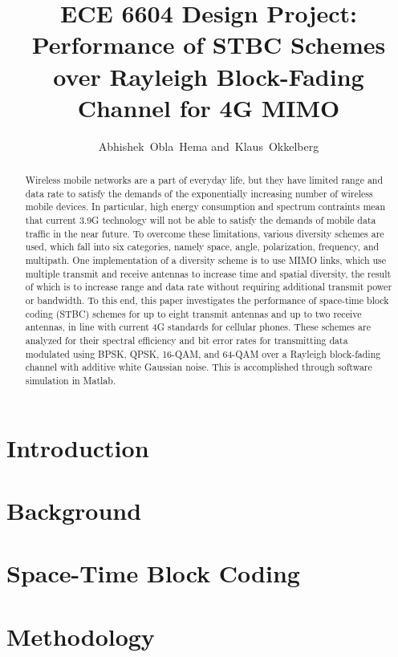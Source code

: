 \documentclass[12pt,onecolumn]{IEEEtran}
\title{ECE 6604 Design Project:\\ Performance of STBC Schemes over Rayleigh Block-Fading Channel for 4G MIMO}
\author{Abhishek~Obla~Hema and~Klaus~Okkelberg}
\begin{document}
\maketitle

\begin{abstract}
  Wireless mobile networks are a part of everyday life, but they have limited range and data rate to satisfy the demands of the exponentially increasing number of wireless mobile devices. In particular, high energy consumption and spectrum contraints mean that current 3.9G technology will not be able to satisfy the demands of mobile data traffic in the near future. To overcome these limitations, various diversity schemes are used, which fall into six categories, namely space, angle, polarization, frequency, and multipath. One implementation of a diversity scheme is to use MIMO links, which use multiple transmit and receive antennas to increase time and spatial diversity, the result of which is to increase range and data rate without requiring additional transmit power or bandwidth. To this end, this paper investigates the performance of space-time block coding (STBC) schemes for up to eight transmit antennas and up to two receive antennas, in line with current 4G standards for cellular phones. These schemes are analyzed for their spectral efficiency and bit error rates for transmitting data modulated using BPSK, QPSK, 16-QAM, and 64-QAM over a Rayleigh block-fading channel with additive white Gaussian noise. This is accomplished through software simulation in Matlab.
\end{abstract}

\section{Introduction}


\section{Background}


\section{Space-Time Block Coding}


\section{Methodology}

\end{document}
